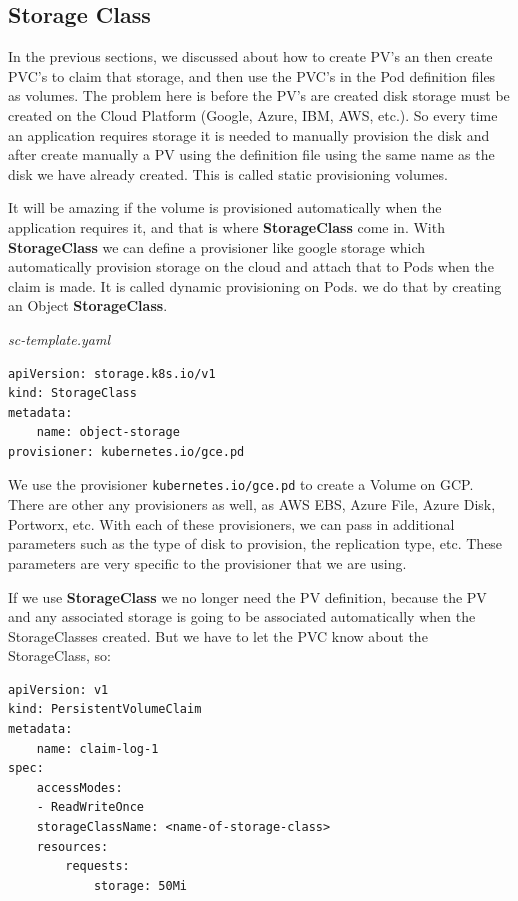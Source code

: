 \documentclass{article}
\newenvironment{codetemplate}[1][]{%
  \mybasecolorbox[#1]
  \itshape
}{%
  \endmybasecolorbox
}
\begin{document}
\subsection{Storage Class}

In the previous sections, we discussed about how to create PV's an then create PVC's to claim that storage, and then use the PVC's in the Pod definition files as volumes. The problem here is before the PV's are created disk storage must be created on the Cloud Platform (Google, Azure, IBM, AWS, etc.). So every time an application requires storage it is needed to manually provision the disk and after create manually a PV using the definition file using the same name as the disk we have already created. This is called static provisioning volumes.

It will be amazing if the volume is provisioned automatically when the application requires it, and that is where \textbf{StorageClass} come in. With \textbf{StorageClass} we can define a provisioner like google storage which automatically provision storage on the cloud and attach that to Pods when the claim is made. It is called dynamic provisioning on Pods. we do that by creating an Object \textbf{StorageClass}.

\begin{codetemplate}{sc-template.yaml}
\begin{verbatim}
apiVersion: storage.k8s.io/v1
kind: StorageClass
metadata:
    name: object-storage
provisioner: kubernetes.io/gce.pd
\end{verbatim}
\end{codetemplate}

We use the provisioner \verb|kubernetes.io/gce.pd| to create a Volume on GCP. There are other any provisioners as well, as AWS EBS, Azure File, Azure Disk, Portworx, etc. With each of these provisioners, we can pass in additional parameters such as the type of disk to provision, the replication type, etc. These parameters are very specific to the provisioner that we are using.

If we use \textbf{StorageClass} we no longer need the PV definition, because the PV and any associated storage is going to be associated automatically when the StorageClasses created. But we have to let the PVC know about the StorageClass, so:

\begin{codetemplate}{}
\begin{verbatim}
apiVersion: v1
kind: PersistentVolumeClaim
metadata:
    name: claim-log-1
spec:
    accessModes:
    - ReadWriteOnce
    storageClassName: <name-of-storage-class>
    resources:
        requests:
            storage: 50Mi
\end{verbatim}
\end{codetemplate}
\end{document}
